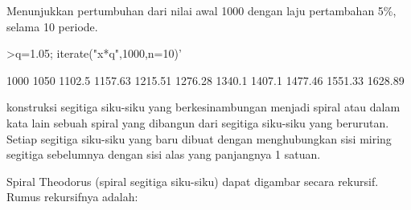 \documentclass[a4paper,10pt]{article}
\begin{document}
\begin{eulernotebook}
\begin{eulercomment}
\begin{eulercomment}
\begin{eulercomment}
\begin{eulercomment}
\begin{eulercomment}
Menunjukkan pertumbuhan dari nilai awal 1000 dengan laju pertambahan
5\%, selama 10 periode.
\end{eulercomment}
\begin{eulerprompt}
>q=1.05; iterate("x*q",1000,n=10)'
\end{eulerprompt}
\begin{euleroutput}
           1000 
           1050 
         1102.5 
        1157.63 
        1215.51 
        1276.28 
         1340.1 
         1407.1 
        1477.46 
        1551.33 
        1628.89 
\end{euleroutput}
\begin{eulercomment}
konstruksi segitiga siku-siku yang berkesinambungan menjadi spiral
atau dalam kata lain sebuah spiral yang dibangun dari segitiga
siku-siku yang berurutan. Setiap segitiga siku-siku yang baru dibuat
dengan menghubungkan sisi miring segitiga sebelumnya dengan sisi alas
yang panjangnya 1 satuan.

Spiral Theodorus (spiral segitiga siku-siku) dapat digambar secara
rekursif. Rumus rekursifnya adalah:


\end{eulercomment}
\end{eulercomment}
\end{eulercomment}
\end{eulercomment}
\end{eulercomment}
\end{eulernotebook}
\end{document}
